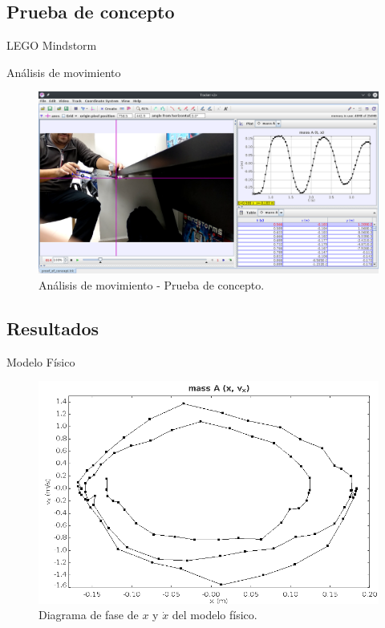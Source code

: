 \documentclass{beamer}
\begin{document}
\subsection{Prueba de concepto}
\begin{frame}{LEGO Mindstorm}

\end{frame}

\begin{frame}{Análisis de movimiento}
 \begin{figure}[h]
 \centering
 \includegraphics[scale=0.2]{../Report/img/tracker_poc.png}
 \caption{Análisis de movimiento - Prueba de concepto.}
 \label{fig: tracker main window}
\end{figure}

\end{frame}

\subsection{Resultados}
\begin{frame}{Modelo Físico}
 \begin{figure}[h]
 \centering
 \includegraphics[scale=0.2]{../Report/img/tracker_poc_phasediagram_x_vx.png}
 \caption{Diagrama de fase de $x$ y $\dot{x}$ del modelo físico.}
 \label{fig: tracker phase diagram x vx}
\end{figure}

\end{frame}
\end{document}
